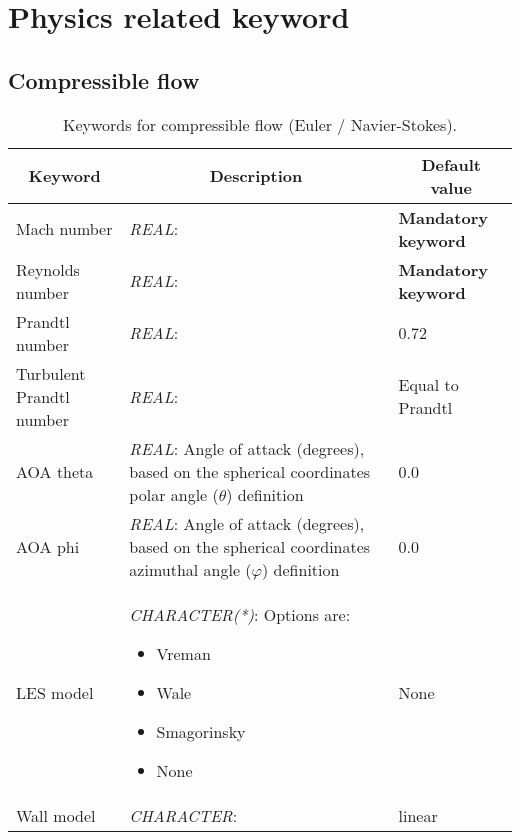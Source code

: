 \documentclass[a4paper,10pt]{report}
\begin{document}
\chapter{Physics related keyword}

\section{Compressible flow}

\begin{table}[htbp]
\caption{Keywords for compressible flow (Euler / Navier-Stokes).}
\begin{tabular}{|l|p{10cm}|p{2.2cm}|}
\hline
\multicolumn{1}{|c|}{Keyword} & \multicolumn{1}{c|}{Description} & \multicolumn{1}{c|}{Default value} \\ \hline

Mach number					& \textit{REAL}:  & \textbf{Mandatory keyword} \\ \hline

Reynolds number				& \textit{REAL}:  & \textbf{Mandatory keyword} \\ \hline

Prandtl number				& \textit{REAL}:  & 0.72 \\ \hline

Turbulent Prandtl number	& \textit{REAL}:  & Equal to Prandtl \\ \hline

    AOA theta             & \textit{REAL}: Angle of attack (degrees), based on the spherical coordinates polar angle ($\theta$) definition  & 0.0 \\ \hline

    AOA phi               & \textit{REAL}: Angle of attack (degrees), based on the spherical coordinates azimuthal angle ($\varphi$) definition  & 0.0 \\ \hline

LES model					& \textit{CHARACTER(*)}: Options are:
\begin{itemize}
\item Vreman
\item Wale    
\item Smagorinsky
\item None
\end{itemize}
 & None \\ \hline

Wall model					& \textit{CHARACTER}:  & linear \\ \hline

\end{tabular}
\label{tab:compressibleFlowkey}
\end{table}
\end{document}
